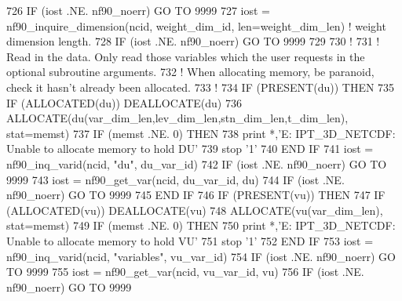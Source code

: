 \begin{DoxyCode}
726     \textcolor{keywordflow}{IF} (iost .NE. nf90\_noerr) \textcolor{keywordflow}{GO TO} 9999
727     iost    = nf90\_inquire\_dimension(ncid, weight\_dim\_id, len=weight\_dim\_len)   \textcolor{comment}{! weight dimension length.}
728     \textcolor{keywordflow}{IF} (iost .NE. nf90\_noerr) \textcolor{keywordflow}{GO TO} 9999
729 
730     \textcolor{comment}{!}
731     \textcolor{comment}{! Read in the data. Only read those variables which the user requests in the optional subroutine
       arguments.}
732     \textcolor{comment}{! When allocating memory, be paranoid, check it hasn't already been allocated.}
733     \textcolor{comment}{!}
734     \textcolor{keywordflow}{IF} (\textcolor{keyword}{PRESENT}(du)) \textcolor{keywordflow}{THEN}
735         \textcolor{keywordflow}{IF} (\textcolor{keyword}{ALLOCATED}(du))          \textcolor{keyword}{DEALLOCATE}(du)
736         \textcolor{keyword}{ALLOCATE}(du(var\_dim\_len,lev\_dim\_len,stn\_dim\_len,t\_dim\_len), stat=memst)
737         \textcolor{keywordflow}{IF} (memst .NE. 0) \textcolor{keywordflow}{THEN}
738             print *,\textcolor{stringliteral}{'E: IPT\_3D\_NETCDF: Unable to allocate memory to hold DU'}
739             stop \textcolor{stringliteral}{'1'}
740 \textcolor{keywordflow}{        END IF}
741         iost = nf90\_inq\_varid(ncid, \textcolor{stringliteral}{"du"}, du\_var\_id)
742         \textcolor{keywordflow}{IF} (iost .NE. nf90\_noerr) \textcolor{keywordflow}{GO TO} 9999
743         iost = nf90\_get\_var(ncid, du\_var\_id, du)
744         \textcolor{keywordflow}{IF} (iost .NE. nf90\_noerr) \textcolor{keywordflow}{GO TO} 9999
745 \textcolor{keywordflow}{    END IF}
746     \textcolor{keywordflow}{IF} (\textcolor{keyword}{PRESENT}(vu)) \textcolor{keywordflow}{THEN}
747         \textcolor{keywordflow}{IF} (\textcolor{keyword}{ALLOCATED}(vu))          \textcolor{keyword}{DEALLOCATE}(vu)
748         \textcolor{keyword}{ALLOCATE}(vu(var\_dim\_len), stat=memst)
749         \textcolor{keywordflow}{IF} (memst .NE. 0) \textcolor{keywordflow}{THEN}
750             print *,\textcolor{stringliteral}{'E: IPT\_3D\_NETCDF: Unable to allocate memory to hold VU'}
751             stop \textcolor{stringliteral}{'1'}
752 \textcolor{keywordflow}{        END IF}
753         iost = nf90\_inq\_varid(ncid, \textcolor{stringliteral}{"variables"}, vu\_var\_id)
754         \textcolor{keywordflow}{IF} (iost .NE. nf90\_noerr) \textcolor{keywordflow}{GO TO} 9999
755         iost = nf90\_get\_var(ncid, vu\_var\_id, vu)
756         \textcolor{keywordflow}{IF} (iost .NE. nf90\_noerr) \textcolor{keywordflow}{GO TO} 9999

\end{DoxyCode}
